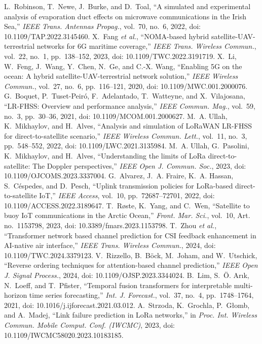 L.~Robinson, T.~Newe, J.~Burke, and D.~Toal, ``A simulated and experimental analysis of evaporation duct effects on microwave communications in the Irish Sea,'' \emph{IEEE Trans. Antennas Propag.}, vol.~70, no.~6, 2022, doi: 10.1109/TAP.2022.3145460.
 X.~Fang \emph{et al.}, ``NOMA-based hybrid satellite-UAV-terrestrial networks for 6G maritime coverage,'' \emph{IEEE Trans. Wireless Commun.}, vol.~22, no.~1, pp.~138--152, 2023, doi: 10.1109/TWC.2022.3191719.
 X.~Li, W.~Feng, J.~Wang, Y.~Chen, N.~Ge, and C.-X. Wang, ``Enabling 5G on the ocean: A hybrid satellite-UAV-terrestrial network solution,'' \emph{IEEE Wireless Commun.}, vol.~27, no.~6, pp.~116--121, 2020, doi: 10.1109/MWC.001.2000076.
 G.~Boquet, P.~Tuset-Peir\'o, F.~Adelantado, T.~Watteyne, and X.~Vilajosana, ``LR-FHSS: Overview and performance analysis,'' \emph{IEEE Commun. Mag.}, vol.~59, no.~3, pp.~30--36, 2021, doi: 10.1109/MCOM.001.2000627.
 M.~A. Ullah, K.~Mikhaylov, and H.~Alves, ``Analysis and simulation of LoRaWAN LR-FHSS for direct-to-satellite scenario,'' \emph{IEEE Wireless Commun. Lett.}, vol.~11, no.~3, pp.~548--552, 2022, doi: 10.1109/LWC.2021.3135984.
 M.~A. Ullah, G.~Pasolini, K.~Mikhaylov, and H.~Alves, ``Understanding the limits of LoRa direct-to-satellite: The Doppler perspectives,'' \emph{IEEE Open J. Commun. Soc.}, 2023, doi: 10.1109/OJCOMS.2023.3337004.
 G.~Alvarez, J.~A. Fraire, K.~A. Hassan, S.~C\'espedes, and D.~Pesch, ``Uplink transmission policies for LoRa-based direct-to-satellite IoT,'' \emph{IEEE Access}, vol.~10, pp.~72687--72701, 2022, doi: 10.1109/ACCESS.2022.3189647.
 T.~R{\o}ste, K.~Yang, and C.~Wen, ``Satellite to buoy IoT communications in the Arctic Ocean,'' \emph{Front. Mar. Sci.}, vol.~10, Art. no.~1153798, 2023, doi: 10.3389/fmars.2023.1153798.
 T.~Zhou \emph{et al.}, ``Transformer network based channel prediction for CSI feedback enhancement in AI-native air interface,'' \emph{IEEE Trans. Wireless Commun.}, 2024, doi: 10.1109/TWC.2024.3379123.
 V.~Rizzello, B.~B\"ock, M.~Joham, and W.~Utschick, ``Reverse ordering techniques for attention-based channel prediction,'' \emph{IEEE Open J. Signal Process.}, 2024, doi: 10.1109/OJSP.2023.3344024.
 B.~Lim, S.~\"O. Ar{\i}k, N.~Loeff, and T.~Pfister, ``Temporal fusion transformers for interpretable multi-horizon time series forecasting,'' \emph{Int. J. Forecast.}, vol.~37, no.~4, pp.~1748--1764, 2021, doi: 10.1016/j.ijforecast.2021.03.012.
 A.~Strzoda, K.~Grochla, P.~G{\l}omb, and A.~Madej, ``Link failure prediction in LoRa networks,'' in \emph{Proc. Int. Wireless Commun. Mobile Comput. Conf. (IWCMC)}, 2023, doi: 10.1109/IWCMC58020.2023.10183185.

